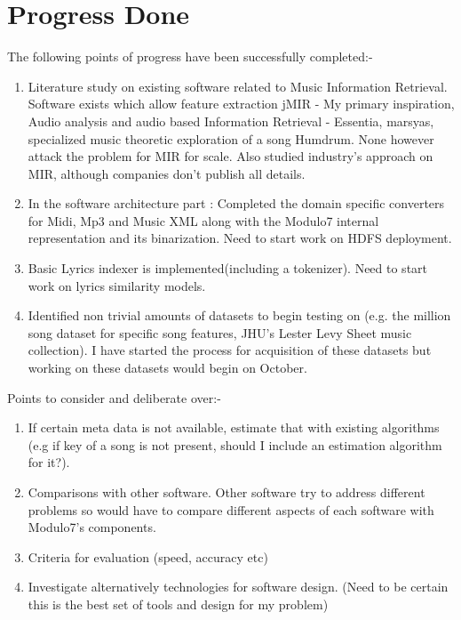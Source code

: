 \chapter{Progress Done}
The following points of progress have been successfully completed:-
\begin{enumerate}
\item Literature study on existing software related to Music Information Retrieval. Software exists which allow feature extraction {jMIR - My primary inspiration}, Audio analysis and audio based Information Retrieval - {Essentia, marsyas}, specialized music theoretic exploration of a song {Humdrum}. None however attack the problem for MIR for scale. Also studied industry's approach on MIR, although companies don't publish all details. 
\item In the software architecture part : Completed the domain specific converters for Midi, Mp3 and Music XML along with the Modulo7 internal representation and its binarization. Need to start work on HDFS deployment.
\item Basic Lyrics indexer is implemented(including a tokenizer). Need to start work on lyrics similarity models. 
\item Identified non trivial amounts of datasets to begin testing on (e.g. the million song dataset for specific song features, JHU's Lester Levy Sheet music collection). I have started the process for acquisition of these datasets but working on these datasets would begin on October. 
\end{enumerate}
Points to consider and deliberate over:-
\begin{enumerate}
\item If certain meta data is not available, estimate that with existing algorithms (e.g if key of a song is not present, should I include an estimation algorithm for it?).
\item Comparisons with other software. Other software try to address different problems so would have to compare different aspects of each software with Modulo7's components.
\item Criteria for evaluation (speed, accuracy etc)
\item Investigate alternatively technologies for software design. (Need to be certain this is the best set of tools and design for my problem)
\end{enumerate}

